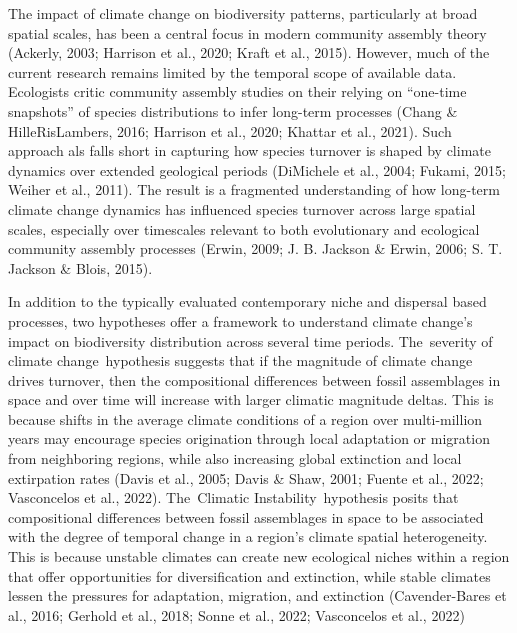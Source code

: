 \documentclass[
]{agujournal2019}
\begin{document}
The impact of climate change on biodiversity patterns, particularly at
broad spatial scales, has been a central focus in modern community
assembly theory (Ackerly, 2003; Harrison et al., 2020; Kraft et al.,
2015). However, much of the current research remains limited by the
temporal scope of available data. Ecologists critic community assembly
studies on their relying on ``one-time snapshots'' of species
distributions to infer long-term processes (Chang \& HilleRisLambers,
2016; Harrison et al., 2020; Khattar et al., 2021). Such approach als
falls short in capturing how species turnover is shaped by climate
dynamics over extended geological periods (DiMichele et al., 2004;
Fukami, 2015; Weiher et al., 2011). The result is a fragmented
understanding of how long-term climate change dynamics has influenced
species turnover across large spatial scales, especially over timescales
relevant to both evolutionary and ecological community assembly
processes (Erwin, 2009; J. B. Jackson \& Erwin, 2006; S. T. Jackson \&
Blois, 2015).

In addition to the typically evaluated contemporary niche and dispersal
based processes, two hypotheses offer a framework to understand climate
change's impact on biodiversity distribution across several time
periods. The~severity of climate change~hypothesis suggests that if the
magnitude of climate change drives turnover, then the compositional
differences between fossil assemblages in space and over time will
increase with larger climatic magnitude deltas. This is because shifts
in the average climate conditions of a region over multi-million years
may encourage species origination through local adaptation or migration
from neighboring regions, while also increasing global extinction and
local extirpation rates (Davis et al., 2005; Davis \& Shaw, 2001; Fuente
et al., 2022; Vasconcelos et al., 2022). The~Climatic
Instability~hypothesis posits that compositional differences between
fossil assemblages in space to be associated with the degree of temporal
change in a region's climate spatial heterogeneity. This is because
unstable climates can create new ecological niches within a region that
offer opportunities for diversification and extinction, while stable
climates lessen the pressures for adaptation, migration, and extinction
(Cavender-Bares et al., 2016; Gerhold et al., 2018; Sonne et al., 2022;
Vasconcelos et al., 2022)
\end{document}
